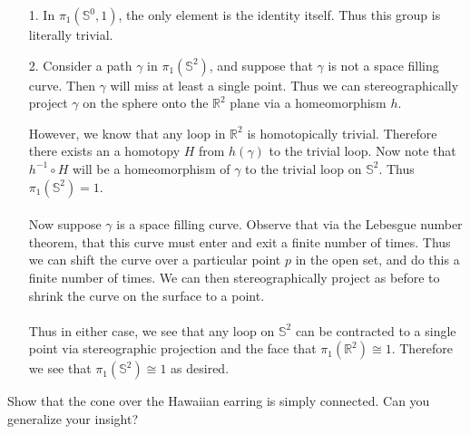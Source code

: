 \documentclass[a4paper,12pt,twoside]{hmcpset}
\begin{document}
\begin{solution}
    \begin{itemize}
        \item[1.] In $\pi_1(\mathbb{S}^0, 1)$, the only element is the
        identity itself. Thus this group is literally trivial.
    
        \item[2.] Consider a path $\gamma$ in $\pi_1(\mathbb{S}^2)$, and
        suppose that $\gamma$ is not a space filling curve. Then $\gamma$
        will miss at least a single point. Thus we can stereographically
        project $\gamma$ on the sphere onto the $\mathbb{R}^2$ plane via a
        homeomorphism $h$.
    
        However, we know that any loop in $\mathbb{R}^2$ is homotopically
        trivial. Therefore there exists an a homotopy $H$ from $h(\gamma)$
        to the trivial loop. Now note that $h^{-1}\circ H$ will be a
        homeomorphism of $\gamma$ to the trivial loop on $\mathbb{S}^2$.
        Thus $\pi_1(\mathbb{S}^2) = 1$. 
        \\
        \\
        Now suppose $\gamma$ is a space filling curve. Observe that 
        via the Lebesgue number
        theorem, that this curve must enter and exit a finite number of
        times. Thus we can shift the curve over a particular point $p$ in
        the open set, and do this a finite number of times. We can then
        stereographically project as before to shrink the curve on the
        surface to a point. 
        \\
        \\
        Thus in either case, we see that any loop on $\mathbb{S}^2$ can be
        contracted to a single point via stereographic projection and the
        face that $\pi_1(\mathbb{R}^2) \cong 1$. Therefore we see that
        $\pi_1(\mathbb{S}^2) \cong 1$ as desired.
        
    \end{itemize}
    
\end{solution}

\begin{exercise}[Exercise 13.13]
    Show that the cone over the Hawaiian earring
is simply connected. Can you generalize your insight?
\end{exercise}
\end{document}
